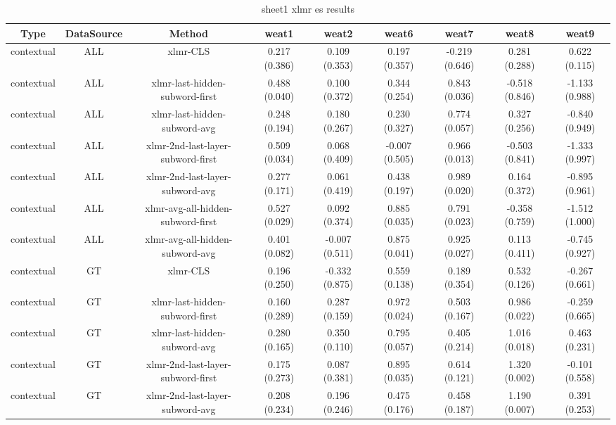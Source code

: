 \begin{sidewaystable}[htb]
    \centering
    \caption{sheet1 xlmr es results}
    \label{appendix_tab:sheet1_xlmr_es_results}
    \small
    \begin{tabular}{@{}ccccccccc@{}}
        \toprule
        Type & DataSource & Method & weat1 & weat2 & weat6 & weat7 & weat8 & weat9 \\
        \midrule
        contextual & ALL & xlmr-CLS & 0.217 (0.386) & 0.109 (0.353) & 0.197 (0.357) & -0.219 (0.646) & 0.281 (0.288) & 0.622 (0.115) \\
        contextual & ALL & xlmr-last-hidden-subword-first & 0.488 (0.040) & 0.100 (0.372) & 0.344 (0.254) & 0.843 (0.036) & -0.518 (0.846) & -1.133 (0.988) \\
        contextual & ALL & xlmr-last-hidden-subword-avg & 0.248 (0.194) & 0.180 (0.267) & 0.230 (0.327) & 0.774 (0.057) & 0.327 (0.256) & -0.840 (0.949) \\
        contextual & ALL & xlmr-2nd-last-layer-subword-first & 0.509 (0.034) & 0.068 (0.409) & -0.007 (0.505) & 0.966 (0.013) & -0.503 (0.841) & -1.333 (0.997) \\
        contextual & ALL & xlmr-2nd-last-layer-subword-avg & 0.277 (0.171) & 0.061 (0.419) & 0.438 (0.197) & 0.989 (0.020) & 0.164 (0.372) & -0.895 (0.961) \\
        contextual & ALL & xlmr-avg-all-hidden-subword-first & 0.527 (0.029) & 0.092 (0.374) & 0.885 (0.035) & 0.791 (0.023) & -0.358 (0.759) & -1.512 (1.000) \\
        contextual & ALL & xlmr-avg-all-hidden-subword-avg & 0.401 (0.082) & -0.007 (0.511) & 0.875 (0.041) & 0.925 (0.027) & 0.113 (0.411) & -0.745 (0.927) \\
        contextual & GT & xlmr-CLS & 0.196 (0.250) & -0.332 (0.875) & 0.559 (0.138) & 0.189 (0.354) & 0.532 (0.126) & -0.267 (0.661) \\
        contextual & GT & xlmr-last-hidden-subword-first & 0.160 (0.289) & 0.287 (0.159) & 0.972 (0.024) & 0.503 (0.167) & 0.986 (0.022) & -0.259 (0.665) \\
        contextual & GT & xlmr-last-hidden-subword-avg & 0.280 (0.165) & 0.350 (0.110) & 0.795 (0.057) & 0.405 (0.214) & 1.016 (0.018) & 0.463 (0.231) \\
        contextual & GT & xlmr-2nd-last-layer-subword-first & 0.175 (0.273) & 0.087 (0.381) & 0.895 (0.035) & 0.614 (0.121) & 1.320 (0.002) & -0.101 (0.558) \\
        contextual & GT & xlmr-2nd-last-layer-subword-avg & 0.208 (0.234) & 0.196 (0.246) & 0.475 (0.176) & 0.458 (0.187) & 1.190 (0.007) & 0.391 (0.253) \\

\end{tabular}
\end{sidewaystable}
